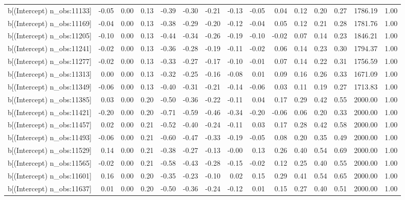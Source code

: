 \begin{table}[ht]
\begin{tabular}{rrrrrrrrrrrrrrr}
  b[(Intercept) n\_obs:11133] & -0.05 & 0.00 & 0.13 & -0.39 & -0.30 & -0.21 & -0.13 & -0.05 & 0.04 & 0.12 & 0.20 & 0.27 & 1786.19 & 1.00 \\ 
  b[(Intercept) n\_obs:11169] & -0.04 & 0.00 & 0.13 & -0.38 & -0.29 & -0.20 & -0.12 & -0.04 & 0.05 & 0.12 & 0.21 & 0.28 & 1781.76 & 1.00 \\ 
  b[(Intercept) n\_obs:11205] & -0.10 & 0.00 & 0.13 & -0.44 & -0.34 & -0.26 & -0.19 & -0.10 & -0.02 & 0.07 & 0.14 & 0.23 & 1846.21 & 1.00 \\ 
  b[(Intercept) n\_obs:11241] & -0.02 & 0.00 & 0.13 & -0.36 & -0.28 & -0.19 & -0.11 & -0.02 & 0.06 & 0.14 & 0.23 & 0.30 & 1794.37 & 1.00 \\ 
  b[(Intercept) n\_obs:11277] & -0.02 & 0.00 & 0.13 & -0.33 & -0.27 & -0.17 & -0.10 & -0.01 & 0.07 & 0.14 & 0.22 & 0.31 & 1756.59 & 1.00 \\ 
  b[(Intercept) n\_obs:11313] & 0.00 & 0.00 & 0.13 & -0.32 & -0.25 & -0.16 & -0.08 & 0.01 & 0.09 & 0.16 & 0.26 & 0.33 & 1671.09 & 1.00 \\ 
  b[(Intercept) n\_obs:11349] & -0.06 & 0.00 & 0.13 & -0.40 & -0.31 & -0.21 & -0.14 & -0.06 & 0.03 & 0.11 & 0.19 & 0.27 & 1713.83 & 1.00 \\ 
  b[(Intercept) n\_obs:11385] & 0.03 & 0.00 & 0.20 & -0.50 & -0.36 & -0.22 & -0.11 & 0.04 & 0.17 & 0.29 & 0.42 & 0.55 & 2000.00 & 1.00 \\ 
  b[(Intercept) n\_obs:11421] & -0.20 & 0.00 & 0.20 & -0.71 & -0.59 & -0.46 & -0.34 & -0.20 & -0.06 & 0.06 & 0.20 & 0.33 & 2000.00 & 1.00 \\ 
  b[(Intercept) n\_obs:11457] & 0.02 & 0.00 & 0.21 & -0.52 & -0.40 & -0.24 & -0.11 & 0.03 & 0.17 & 0.28 & 0.42 & 0.58 & 2000.00 & 1.00 \\ 
  b[(Intercept) n\_obs:11493] & -0.06 & 0.00 & 0.21 & -0.60 & -0.47 & -0.33 & -0.19 & -0.05 & 0.08 & 0.20 & 0.35 & 0.49 & 2000.00 & 1.00 \\ 
  b[(Intercept) n\_obs:11529] & 0.14 & 0.00 & 0.21 & -0.38 & -0.27 & -0.13 & -0.00 & 0.13 & 0.26 & 0.40 & 0.54 & 0.69 & 2000.00 & 1.00 \\ 
  b[(Intercept) n\_obs:11565] & -0.02 & 0.00 & 0.21 & -0.58 & -0.43 & -0.28 & -0.15 & -0.02 & 0.12 & 0.25 & 0.40 & 0.55 & 2000.00 & 1.00 \\ 
  b[(Intercept) n\_obs:11601] & 0.16 & 0.00 & 0.20 & -0.35 & -0.23 & -0.10 & 0.02 & 0.15 & 0.29 & 0.41 & 0.54 & 0.65 & 2000.00 & 1.00 \\ 
  b[(Intercept) n\_obs:11637] & 0.01 & 0.00 & 0.20 & -0.50 & -0.36 & -0.24 & -0.12 & 0.01 & 0.15 & 0.27 & 0.40 & 0.51 & 2000.00 & 1.00 \\ 

\end{tabular}
\end{table}
